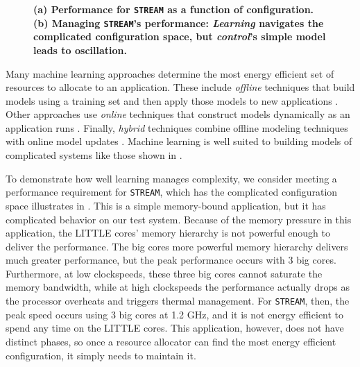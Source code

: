 \begin{figure}
\centering
  \subfloat[]
  {
    
    \label{fig:STREAM_timeline}
  }
  \caption{\small \bf (a) Performance for \texttt{STREAM} as a
    function of configuration.  (b) Managing \texttt{STREAM}'s
    performance: \emph{Learning} navigates the complicated
    configuration space, but \emph{control}'s simple model leads to
    oscillation.}
  \label{fig:learning-models1}
\end{figure}

Many machine learning approaches determine the most energy efficient
set of resources to allocate to an application.  These include
\emph{offline} techniques that build models using a training set and
then apply those models to new applications
\cite{Yi2003,LeeBrooks2006,CPR,ChenJohn2011,reddiHPCA2013,Paragon}.
Other approaches use \emph{online} techniques that construct models
dynamically as an application runs
\cite{Li2006,Flicker,ParallelismDial,Ponamarev,LeeBrooks}.  Finally,
\emph{hybrid} techniques combine offline modeling techniques with
online model updates
\cite{Zhang2012,packandcap,Winter2010,dubach2010,Koala,Cinder,
  wu2012inferred}.  Machine learning is well suited to building models
of complicated systems like those shown in
.

To demonstrate how well learning manages complexity, we consider
meeting a performance requirement for \texttt{STREAM}, which has the
complicated configuration space illustrates in
.  This is a simple memory-bound
application, but it has complicated behavior on our test system.
Because of the memory pressure in this application, the LITTLE cores'
memory hierarchy is not powerful enough to deliver the performance.
The big cores more powerful memory hierarchy delivers much greater
performance, but the peak performance occurs with 3 big cores.
Furthermore, at low clockspeeds, these three big cores cannot saturate
the memory bandwidth, while at high clockspeeds the performance
actually drops as the processor overheats and triggers thermal
management.  For \texttt{STREAM}, then, the peak speed occurs using 3
big cores at 1.2 GHz, and it is not energy efficient to spend any time
on the LITTLE cores.  This application, however, does not have
distinct phases, so once a resource allocator can find the most energy
efficient configuration, it simply needs to maintain it.


